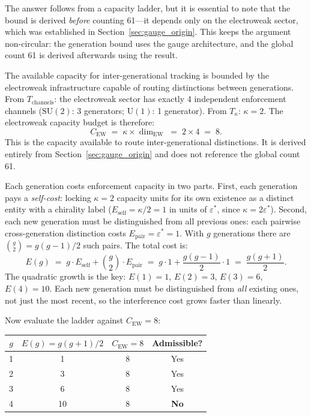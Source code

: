\documentclass[11pt]{article}
\newcommand{\SU}{\mathrm{SU}}
\newcommand{\U}{\mathrm{U}}
\begin{document}
The answer follows from a capacity ladder, but it is essential to note that the bound is derived \emph{before} counting 61---it depends only on the electroweak sector, which was established in Section~\ref{sec:gauge_origin}.  This keeps the argument non-circular: the generation bound uses the gauge architecture, and the global count 61 is derived afterwards using the result.

The available capacity for inter-generational tracking is bounded by the electroweak infrastructure capable of routing distinctions between generations.  From $T_{\mathrm{channels}}$: the electroweak sector has exactly 4 independent enforcement channels ($\SU(2)$: 3 generators; $\U(1)$: 1 generator).  From $T_\kappa$: $\kappa = 2$.  The electroweak capacity budget is therefore:
\begin{equation}
C_{\mathrm{EW}} \;=\; \kappa \times \dim_{\mathrm{EW}} \;=\; 2 \times 4 \;=\; 8.
\label{eq:c_ew}
\end{equation}
This is the capacity available to route inter-generational distinctions.  It is derived entirely from Section~\ref{sec:gauge_origin} and does not reference the global count 61.

Each generation costs enforcement capacity in two parts.  First, each generation pays a \emph{self-cost}: locking $\kappa = 2$ capacity units for its own existence as a distinct entity with a chirality label ($E_{\mathrm{self}} = \kappa/2 = 1$ in units of $\varepsilon^*$, since $\kappa = 2\varepsilon^*$).  Second, each new generation must be distinguished from all previous ones: each pairwise cross-generation distinction costs $E_{\mathrm{pair}} = \varepsilon^* = 1$.  With $g$ generations there are $\binom{g}{2} = g(g-1)/2$ such pairs.  The total cost is:
\begin{equation}
E(g) \;=\; g \cdot E_{\mathrm{self}} + \binom{g}{2} \cdot E_{\mathrm{pair}} \;=\; g \cdot 1 + \frac{g(g-1)}{2} \cdot 1 \;=\; \frac{g(g+1)}{2}.
\label{eq:capacity_ladder}
\end{equation}
The quadratic growth is the key: $E(1) = 1$, $E(2) = 3$, $E(3) = 6$, $E(4) = 10$.  Each new generation must be distinguished from \emph{all} existing ones, not just the most recent, so the interference cost grows faster than linearly.

Now evaluate the ladder against $C_{\mathrm{EW}} = 8$:

\begin{center}
\begin{tabular}{cccc}
\toprule
$g$ & $E(g) = g(g+1)/2$ & $C_{\mathrm{EW}} = 8$ & Admissible? \\
\midrule
1 & 1 & 8 & Yes \\
2 & 3 & 8 & Yes \\
3 & 6 & 8 & Yes \\
4 & 10 & 8 & \textbf{No} \\
\bottomrule
\end{tabular}
\end{center}
\end{document}
